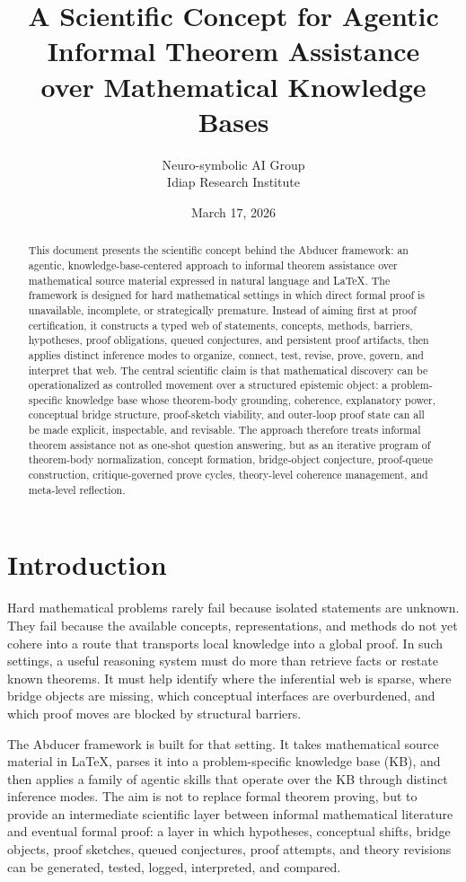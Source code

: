 \documentclass[11pt]{article}
\title{A Scientific Concept for Agentic Informal Theorem Assistance\\over Mathematical Knowledge Bases}
\author{Neuro-symbolic AI Group\\Idiap Research Institute}
\date{March 17, 2026}
\begin{document}
\maketitle

\begin{abstract}
This document presents the scientific concept behind the Abducer framework: an agentic, knowledge-base-centered approach to informal theorem assistance over mathematical source material expressed in natural language and \LaTeX. The framework is designed for hard mathematical settings in which direct formal proof is unavailable, incomplete, or strategically premature. Instead of aiming first at proof certification, it constructs a typed web of statements, concepts, methods, barriers, hypotheses, proof obligations, queued conjectures, and persistent proof artifacts, then applies distinct inference modes to organize, connect, test, revise, prove, govern, and interpret that web. The central scientific claim is that mathematical discovery can be operationalized as controlled movement over a structured epistemic object: a problem-specific knowledge base whose theorem-body grounding, coherence, explanatory power, conceptual bridge structure, proof-sketch viability, and outer-loop proof state can all be made explicit, inspectable, and revisable. The approach therefore treats informal theorem assistance not as one-shot question answering, but as an iterative program of theorem-body normalization, concept formation, bridge-object conjecture, proof-queue construction, critique-governed prove cycles, theory-level coherence management, and meta-level reflection.
\end{abstract}

\section{Introduction}

Hard mathematical problems rarely fail because isolated statements are unknown. They fail because the available concepts, representations, and methods do not yet cohere into a route that transports local knowledge into a global proof. In such settings, a useful reasoning system must do more than retrieve facts or restate known theorems. It must help identify where the inferential web is sparse, where bridge objects are missing, which conceptual interfaces are overburdened, and which proof moves are blocked by structural barriers.

The Abducer framework is built for that setting. It takes mathematical source material in \LaTeX, parses it into a problem-specific knowledge base (KB), and then applies a family of agentic skills that operate over the KB through distinct inference modes. The aim is not to replace formal theorem proving, but to provide an intermediate scientific layer between informal mathematical literature and eventual formal proof: a layer in which hypotheses, conceptual shifts, bridge objects, proof sketches, queued conjectures, proof attempts, and theory revisions can be generated, tested, logged, interpreted, and compared.
\end{document}
